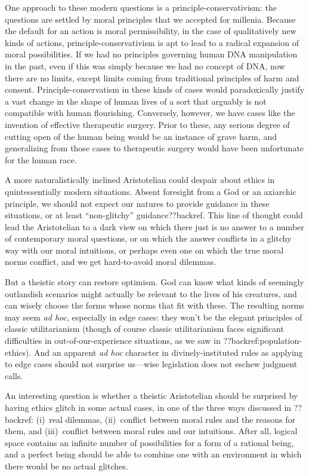 One approach to these modern questions is a principle-conservativism: the questions are settled by moral principles that we accepted
for millenia. Because the default for an action is moral permissibility, in the case of qualitatively new kinds of actions, 
principle-conservativism is apt to lead to a radical expansion of moral possibilities. If we had no principles governing human DNA
manipulation in the past, even if this was simply because we had no concept of DNA, now there are no limits, except limits coming
from traditional principles of harm and consent. Principle-conservatism in these kinds of cases would paradoxically justify a vast 
change in the shape of human lives of a sort that arguably is not compatible with human flourishing. Conversely, however, we have 
cases like the invention of effective therapeutic surgery. Prior to these, any serious degree of cutting open of the human being would be an instance of grave harm, and generalizing from
those cases to therapeutic surgery would have been unfortunate for the human race. 

A more naturalistically inclined Aristotelian could despair about ethics in quintessentially modern situations. Absent foresight from a God
or an axiarchic principle, we should not expect our natures to provide guidance in these situations, or at least ``non-glitchy''
guidance??backref. This line of thought could lead the Aristotelian to a dark view on which there just is no answer to a number
of contemporary moral questions, or on which the answer conflicts in a glitchy way with our moral intuitions, or perhaps
even one on which the true moral norms conflict, and we get hard-to-avoid moral dilemmas. 

But a theistic story can restore optimism. God can know what kinds of seemingly outlandish scenarios might
actually be relevant to the lives of his creatures, and can wisely choose the forms whose norms that fit with these. The resulting norms may 
seem \textit{ad hoc}, especially in edge cases: they won't be the elegant principles of classic utilitarianism (though of course classic utilitarianism
faces significant difficulties in out-of-our-experience situations, as we saw in ??backref:population-ethics). And an apparent
\textit{ad hoc} character in divinely-instituted rules as applying to edge cases should not surprise us---wise legislation does not eschew 
judgment calls.

An interesting question is whether a theistic Aristotelian should be surprised by having ethics glitch in some actual cases, in one of 
the three ways discussed in ??backref: (i)~real dilemmas, (ii)~conflict between moral rules and the reasons for them, and (iii)~conflict between
moral rules and our intuitions. After all, logical space contains an infinite number of possibilities for a form of a rational 
being, and a perfect being should be able to combine one with an environment in which there would be no actual glitches. 

